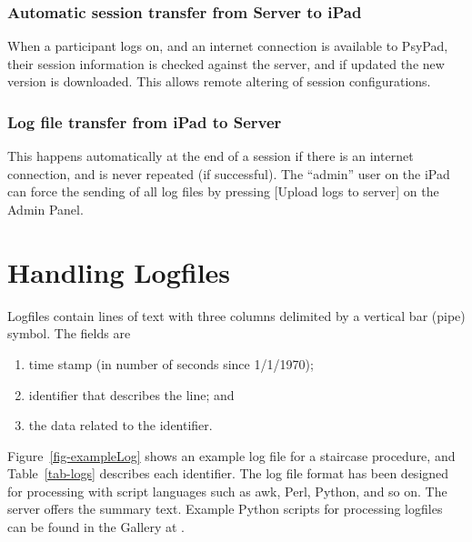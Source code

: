 \documentclass{article}
\begin{document}
\subsubsection{Automatic session transfer from Server to iPad}

When a participant logs on, and an internet connection is available to PsyPad, 
their session information is checked against the server, and if updated the
new version is downloaded. This allows remote altering of session configurations. 

\subsubsection{Log file transfer from iPad to Server}

This happens automatically at the end of a session if there is an internet
connection, and is never repeated (if successful).
The ``admin'' user on the iPad can force the sending of all 
log files by pressing [Upload logs to server] on the Admin Panel.

\section{Handling Logfiles}
\label{sec-logs}

Logfiles contain lines of text with three columns delimited by a vertical bar (pipe) symbol. The fields are
\begin{enumerate}
    \item time stamp (in number of seconds since 1/1/1970); 
    \item identifier that describes the line; and
    \item the data related to the identifier.
\end{enumerate}
Figure~\ref{fig-exampleLog} shows an example log file for a staircase procedure, and Table~\ref{tab-logs} describes each
identifier.
The log file format has been designed for processing with script languages such as awk, Perl, Python, and so on. The
 server offers the summary text. 
Example Python scripts for processing logfiles can be found in the Gallery at .
\end{document}
